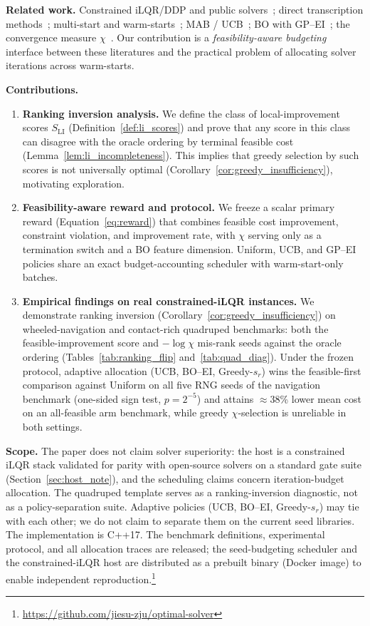 \documentclass[lettersize,journal]{IEEEtran}
\begin{document}
\textbf{Related work.} Constrained iLQR/DDP and public
solvers~\cite{tassa2012,howell2019,mastalli2020}; direct transcription
methods~\cite{posa2014,schulman2014}; multi-start and
warm-starts~\cite{gyorgy2011,jain2019,merkt2021}; MAB /
UCB~\cite{auer2002}; BO with GP--EI~\cite{shahriari2016,srinivas2010,
rasmussen2006}; the convergence measure $\chi$~\cite{zhu2024}.
Our contribution is a \emph{feasibility-aware budgeting} interface between
these literatures and the practical problem of allocating solver iterations
across warm-starts.

\textbf{Contributions.}
\begin{enumerate}
  \item \textbf{Ranking inversion analysis.} We define the class of
    local-improvement scores $S_{\mathrm{LI}}$ (Definition~\ref{def:li_scores})
    and prove that any score in this class can disagree with the
    oracle ordering by terminal feasible cost
    (Lemma~\ref{lem:li_incompleteness}).  This implies that greedy selection
    by such scores is not universally optimal
    (Corollary~\ref{cor:greedy_insufficiency}), motivating exploration.
  \item \textbf{Feasibility-aware reward and protocol.} We freeze a scalar
    primary reward (Equation~\eqref{eq:reward}) that combines feasible cost
    improvement, constraint violation, and improvement rate, with $\chi$
    serving only as a termination switch and a BO feature dimension.
    Uniform, UCB, and GP--EI policies share an exact budget-accounting
    scheduler with warm-start-only batches.
  \item \textbf{Empirical findings on real constrained-iLQR instances.}
    We demonstrate ranking inversion
    (Corollary~\ref{cor:greedy_insufficiency}) on wheeled-navigation and
    contact-rich quadruped benchmarks: both the feasible-improvement score
    and $-\log\chi$ mis-rank seeds against the oracle ordering
    (Tables~\ref{tab:ranking_flip} and~\ref{tab:quad_diag}).
    Under the frozen protocol, adaptive allocation (UCB, BO--EI,
    Greedy-$s_r$) wins the feasible-first comparison against Uniform on
    all five RNG seeds of the navigation benchmark (one-sided sign test,
    $p = 2^{-5}$) and attains $\approx$38\% lower mean cost on an
    all-feasible arm benchmark, while greedy $\chi$-selection is
    unreliable in both settings.
\end{enumerate}
\textbf{Scope.} The paper does not claim solver superiority: the host is a
constrained iLQR stack validated for parity with open-source solvers on a
standard gate suite (Section~\ref{sec:host_note}), and the scheduling
claims concern iteration-budget allocation. The quadruped template serves
as a ranking-inversion diagnostic, not as a policy-separation suite.
Adaptive policies (UCB, BO--EI, Greedy-$s_r$) may tie with each other; we
do not claim to separate them on the current seed libraries.
The implementation is C++17. The benchmark definitions, experimental
protocol, and all allocation traces are released; the seed-budgeting
scheduler and the constrained-iLQR host are distributed as a prebuilt
binary (Docker image) to enable independent reproduction.\footnote{\url{https://github.com/jiesu-zju/optimal-solver}}
\end{document}
